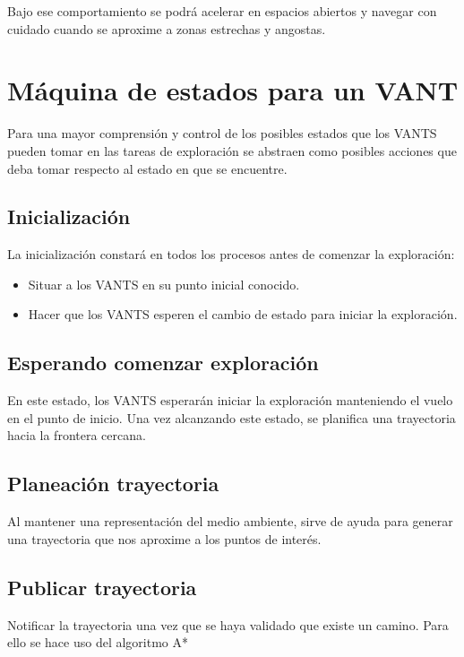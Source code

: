 Bajo ese comportamiento se podrá acelerar en espacios abiertos y navegar con cuidado cuando se aproxime a zonas estrechas y angostas.

\section{Máquina de estados para un VANT}

Para una mayor comprensión y control de los posibles estados que los VANTS pueden tomar
en las tareas de exploración se abstraen como posibles acciones que deba tomar respecto
al estado en que se encuentre.

\subsection*{Inicialización}

La inicialización constará en todos los procesos antes de comenzar la exploración:
\begin{itemize}\setlength{\itemsep}{-1mm}
\item Situar a los VANTS en su punto inicial conocido.
\item Hacer que los VANTS esperen el cambio de estado para iniciar la exploración.
\end{itemize}

\subsection*{Esperando comenzar exploración}

En este estado, los VANTS esperarán iniciar la exploración manteniendo el vuelo en el punto de inicio.
Una vez alcanzando este estado, se planifica una trayectoria hacia la frontera cercana.
\subsection*{Planeación trayectoria}

Al mantener una representación del medio ambiente, sirve de ayuda para generar una trayectoria que nos aproxime a los puntos de interés.

\subsection*{Publicar trayectoria}

Notificar la trayectoria una vez que se haya validado que existe un camino. Para ello se hace uso del algoritmo A* 

